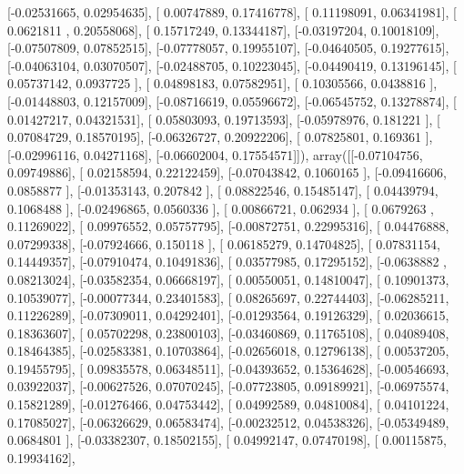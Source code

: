 \documentclass{article}
\begin{document}
       [-0.02531665,  0.02954635],
       [ 0.00747889,  0.17416778],
       [ 0.11198091,  0.06341981],
       [ 0.0621811 ,  0.20558068],
       [ 0.15717249,  0.13344187],
       [-0.03197204,  0.10018109],
       [-0.07507809,  0.07852515],
       [-0.07778057,  0.19955107],
       [-0.04640505,  0.19277615],
       [-0.04063104,  0.03070507],
       [-0.02488705,  0.10223045],
       [-0.04490419,  0.13196145],
       [ 0.05737142,  0.0937725 ],
       [ 0.04898183,  0.07582951],
       [ 0.10305566,  0.0438816 ],
       [-0.01448803,  0.12157009],
       [-0.08716619,  0.05596672],
       [-0.06545752,  0.13278874],
       [ 0.01427217,  0.04321531],
       [ 0.05803093,  0.19713593],
       [-0.05978976,  0.181221  ],
       [ 0.07084729,  0.18570195],
       [-0.06326727,  0.20922206],
       [ 0.07825801,  0.169361  ],
       [-0.02996116,  0.04271168],
       [-0.06602004,  0.17554571]]), array([[-0.07104756,  0.09749886],
       [ 0.02158594,  0.22122459],
       [-0.07043842,  0.1060165 ],
       [-0.09416606,  0.0858877 ],
       [-0.01353143,  0.207842  ],
       [ 0.08822546,  0.15485147],
       [ 0.04439794,  0.1068488 ],
       [-0.02496865,  0.0560336 ],
       [ 0.00866721,  0.062934  ],
       [ 0.0679263 ,  0.11269022],
       [ 0.09976552,  0.05757795],
       [-0.00872751,  0.22995316],
       [ 0.04476888,  0.07299338],
       [-0.07924666,  0.150118  ],
       [ 0.06185279,  0.14704825],
       [ 0.07831154,  0.14449357],
       [-0.07910474,  0.10491836],
       [ 0.03577985,  0.17295152],
       [-0.0638882 ,  0.08213024],
       [-0.03582354,  0.06668197],
       [ 0.00550051,  0.14810047],
       [ 0.10901373,  0.10539077],
       [-0.00077344,  0.23401583],
       [ 0.08265697,  0.22744403],
       [-0.06285211,  0.11226289],
       [-0.07309011,  0.04292401],
       [-0.01293564,  0.19126329],
       [ 0.02036615,  0.18363607],
       [ 0.05702298,  0.23800103],
       [-0.03460869,  0.11765108],
       [ 0.04089408,  0.18464385],
       [-0.02583381,  0.10703864],
       [-0.02656018,  0.12796138],
       [ 0.00537205,  0.19455795],
       [ 0.09835578,  0.06348511],
       [-0.04393652,  0.15364628],
       [-0.00546693,  0.03922037],
       [-0.00627526,  0.07070245],
       [-0.07723805,  0.09189921],
       [-0.06975574,  0.15821289],
       [-0.01276466,  0.04753442],
       [ 0.04992589,  0.04810084],
       [ 0.04101224,  0.17085027],
       [-0.06326629,  0.06583474],
       [-0.00232512,  0.04538326],
       [-0.05349489,  0.0684801 ],
       [-0.03382307,  0.18502155],
       [ 0.04992147,  0.07470198],
       [ 0.00115875,  0.19934162],
\end{document}
